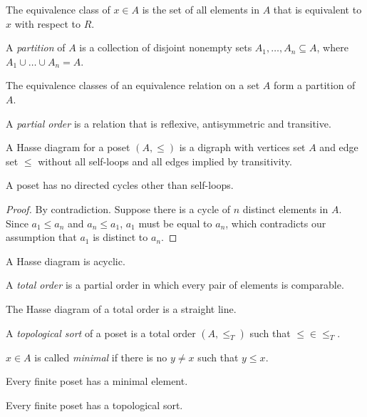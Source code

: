 \documentclass[11pt]{article}
\begin{document}
\begin{definition}
The equivalence class of $x \in A$ is the set of all elements in $A$ that is equivalent to $x$ with
respect to $R$.
\end{definition}

\begin{definition}
A \emph{partition} of $A$ is a collection of disjoint nonempty sets $A_1,\dots,A_n \subseteq A$,
where $A_1\cup\dots\cup A_n = A$.
\end{definition}

\begin{theorem}
The equivalence classes of an equivalence relation on a set $A$ form a partition of $A$.
\end{theorem}

\begin{definition}
A \emph{partial order} is a relation that is reflexive, antisymmetric and transitive.
\end{definition}

\begin{definition}
A Hasse diagram for a poset $(A,\leq)$ is a digraph with vertices set $A$ and edge set $\leq$
without all self-loops and all edges implied by transitivity.
\end{definition}

\begin{theorem}
A poset has no directed cycles other than self-loops.
\end{theorem}

\begin{proof}
By contradiction. Suppose there is a cycle of $n$ distinct elements in $A$. Since $a_1 \leq a_n$
and $a_n \leq a_1$, $a_1$ must be equal to $a_n$, which contradicts our assumption that $a_1$ is
distinct to $a_n$.
\end{proof}

\begin{corollary}
A Hasse diagram is acyclic.
\end{corollary}

\begin{definition}
A \emph{total order} is a partial order in which every pair of elements is comparable.
\end{definition}

\begin{proposition}
The Hasse diagram of a total order is a straight line.
\end{proposition}

\begin{definition}
A \emph{topological sort} of a poset is a total order $(A,\leq_T)$ such that $\leq \in \leq_T$.
\end{definition}

\begin{definition}
$x \in A$ is called \emph{minimal} if there is no $y \neq x$ such that $y \leq x$.
\end{definition}

\begin{lemma}
Every finite poset has a minimal element.
\end{lemma}

\begin{theorem}
Every finite poset has a topological sort.
\end{theorem}
\end{document}
